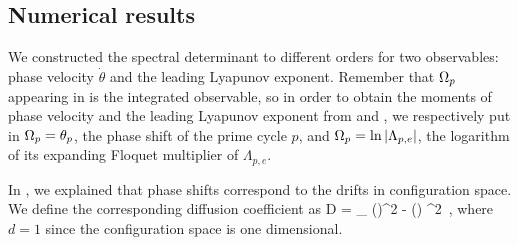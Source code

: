 \documentclass[aip,cha,
reprint,
secnumarabic,
nofootinbib, tightenlines,
nobibnotes, showkeys, showpacs,
superscriptaddress,
]{revtex4-1}
\begin{document}
{\subsection{Numerical results}
\label{s-NumResults}

We constructed the spectral determinant  to different
orders for two observables: phase velocity $\dot{\theta}$ and the leading
Lyapunov exponent. Remember that $\Omega_p$ appearing in
 is the integrated observable, so in order to
obtain the moments of phase velocity and the leading Lyapunov exponent from
 and , we respectively put in
$\Omega_p = \theta_p$, the phase shift of the prime cycle $p$, and
$\Omega_p = \ln |\Lambda_{p,e}|$, the logarithm of its expanding Floquet
multiplier of $\Lambda_{p,e}$.

In , we explained that  phase shifts correspond
to the drifts in configuration space. We define the
corresponding diffusion coefficient as
\beq
    D =          \lim_{\zeit \rightarrow \infty} 
        \langle \theta(\zeit)^2 - \langle \theta(\zeit) \rangle^2 \rangle
\,,
\eeq
where $d=1$ since the configuration space is one dimensional.

}
\end{document}
